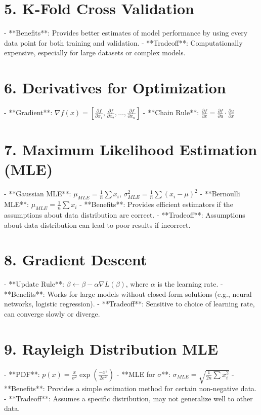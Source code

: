 \documentclass[10pt]{article}
\begin{document}
\begin{multicols}{2}
\section*{5. K-Fold Cross Validation}
- **Benefits**: Provides better estimates of model performance by using every data point for both training and validation.
- **Tradeoff**: Computationally expensive, especially for large datasets or complex models.

\section*{6. Derivatives for Optimization}
- **Gradient**: $\nabla f(x) = \left[\frac{\partial f}{\partial x_1}, \frac{\partial f}{\partial x_2}, \dots, \frac{\partial f}{\partial x_n}\right]$
- **Chain Rule**: $\frac{\partial f}{\partial x} = \frac{\partial f}{\partial u} \cdot \frac{\partial u}{\partial x}$

\section*{7. Maximum Likelihood Estimation (MLE)}
- **Gaussian MLE**: $\mu_{MLE} = \frac{1}{n} \sum x_i$, \quad $\sigma_{MLE}^2 = \frac{1}{n} \sum (x_i - \mu)^2$
- **Bernoulli MLE**: $\mu_{MLE} = \frac{1}{n} \sum x_i$
- **Benefits**: Provides efficient estimators if the assumptions about data distribution are correct.
- **Tradeoff**: Assumptions about data distribution can lead to poor results if incorrect.

\section*{8. Gradient Descent}
- **Update Rule**: $\beta \leftarrow \beta - \alpha\nabla L(\beta)$, where $\alpha$ is the learning rate.
- **Benefits**: Works for large models without closed-form solutions (e.g., neural networks, logistic regression).
- **Tradeoff**: Sensitive to choice of learning rate, can converge slowly or diverge.

\section*{9. Rayleigh Distribution MLE}
- **PDF**: $p(x) = \frac{x}{\sigma^2} \exp\left( \frac{-x^2}{2\sigma^2} \right)$
- **MLE for $\sigma$**: $\sigma_{MLE} = \sqrt{\frac{1}{2n} \sum x_i^2}$
- **Benefits**: Provides a simple estimation method for certain non-negative data.
- **Tradeoff**: Assumes a specific distribution, may not generalize well to other data.


\end{multicols}
\end{document}
